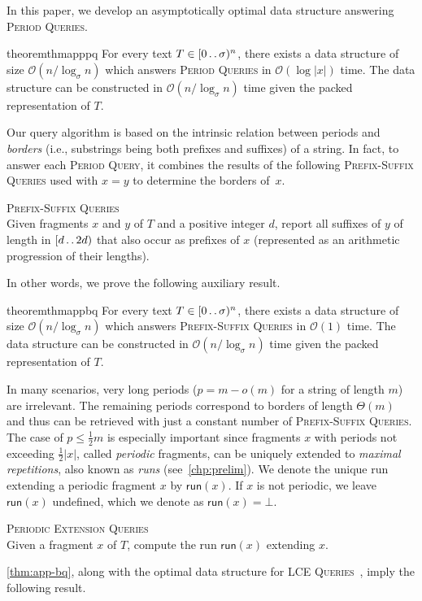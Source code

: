 \documentclass[a4paper]{article}
\theoremstyle{definition}
\theoremstyle{remark}
\newcommand{\PQ}{\textsc{Period Queries}\xspace}
\newcommand{\BQ}{\textsc{Prefix-Suffix Queries}\xspace}
\newcommand{\PEQ}{\textsc{Periodic Extension Queries}\xspace}
\newcommand{\LCEQ}{\textsc{LCE Queries}\xspace}
\newcommand{\dd}{\mathinner{\ldotp\ldotp}}
\newcommand{\Oh}{\mathcal{O}}
\newcommand{\run}{\mathsf{run}}
\newenvironment{dsproblem}[1]
{\begin{center}\begin{lrbox}{\mybox}\begin{minipage}{0.96\columnwidth}{\textsc{#1}}\\}
{\end{minipage}\end{lrbox}\fbox{\usebox{\mybox}}\end{center}}
\newcommand{\defdsproblem}[2]{
  \begin{dsproblem}{#1}
#2
  \end{dsproblem}
  }
\begin{document}
In this paper, we develop an asymptotically optimal data structure answering \PQ.

\begin{restatable}{theorem}{thmapppq}\label{thm:app-pq}
For every text $T\in [0\dd \sigma)^n$, there exists a data structure of size $\Oh(n/\log_\sigma n)$ which answers \PQ in $\Oh(\log |x|)$ time.
The data structure can be constructed in $\Oh(n/\log_\sigma n)$ time given the packed representation of $T$.
\end{restatable}

Our query algorithm is based on the intrinsic relation between periods and \emph{borders} (i.e., substrings being both prefixes and suffixes) of a string.
In fact, to answer each \textsc{Period Query}, it combines the results of the following \BQ
used with $x=y$ to determine the borders of~$x$.

\defdsproblem{\BQ}{Given fragments $x$ and $y$ of $T$ and a positive integer $d$, report all suffixes of $y$ of length in $[d \dd 2d)$
that also occur as prefixes of $x$ (represented as an arithmetic progression of their lengths).}

In other words, we prove the following auxiliary result.

\begin{restatable}{theorem}{thmappbq}\label{thm:app-bq}
For every text $T\in [0\dd\sigma)^n$, there exists a data structure of size $\Oh(n/\log_\sigma n)$ which answers \BQ in $\Oh(1)$ time. The data structure can be constructed in $\Oh(n/\log_\sigma n)$ time given the packed representation of $T$.
\end{restatable}

In many scenarios, very long periods ($p=m-o(m)$ for a string of length $m$) are irrelevant.
The remaining periods correspond to borders of length $\Theta(m)$ and thus can be retrieved with just a constant number of \BQ.
The case of $p \le \tfrac12 m$ is especially important
since fragments $x$ with periods not exceeding $\tfrac12|x|$, called \emph{periodic} fragments, can be uniquely extended to \emph{maximal repetitions}, also known as \emph{runs} (see~\cref{chp:prelim}).
We denote the unique run extending a periodic fragment $x$ by $\run(x)$.
If $x$ is not periodic, we leave $\run(x)$ undefined, which we denote as $\run(x)=\bot$.

\defdsproblem{\PEQ}{Given a fragment $x$ of $T$, compute the run $\run(x)$ extending $x$.}

\noindent
\cref{thm:app-bq}, along with the optimal data structure for \LCEQ~\cite{Kempa2019}, imply the following result.
\end{document}
